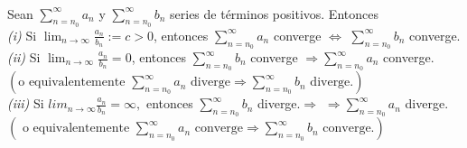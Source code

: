 \documentclass{article}
\theoremstyle{definition}
\theoremstyle{definition}
\theoremstyle{remark}
\begin{document}
\begin{teo} \; \\
  Sean $\sum_{n=n_0}^{\infty}{a_n}$ y $\sum_{n=n_0}^{\infty}{b_n}$ series de términos positivos. Entonces \\
  \emph{(i)} \quad Si $\lim_{n \to \infty}{\frac{a_n}{b_n}}:=c>0$, entonces $\sum_{n=n_0}^{\infty}{a_n}$ converge $\Leftrightarrow$ $\sum_{n=n_0}^{\infty}{b_n}$ converge. \\
  \emph{(ii)}\phantom{ii}   Si $\lim_{n\to\infty}{\frac{a_n}{b_n}}=0$, entonces $\sum_{n=n_0}^{\infty}{b_n}$ converge $\Rightarrow \sum_{n=n_0}^{\infty}{a_n}$ converge. $\left(\text{o equivalentemente }\sum_{n=n_0}^{\infty}{a_n} \text{ diverge} \Rightarrow \sum_{n=n_0}^{\infty}{b_n}\text{ diverge.}\right)$ \\
  \emph{(iii)}\; Si $lim_{n\to\infty}{\frac{a_n}{b_n}}=\infty,$ entonces $\sum_{n=n_0}^{\infty}{b_n}$ diverge.$\Rightarrow$ $\Rightarrow \sum_{n=n_0}^{\infty}{a_n}$ diverge.\\ $\left(\text{ o equivalentemente $\sum_{n=n_0}^{\infty}{a_n}\text{ converge} \Rightarrow \sum_{n=n_0}^{\infty}{b_n}\text{ converge.}$}\right)$ 

\end{teo}
\end{document}
